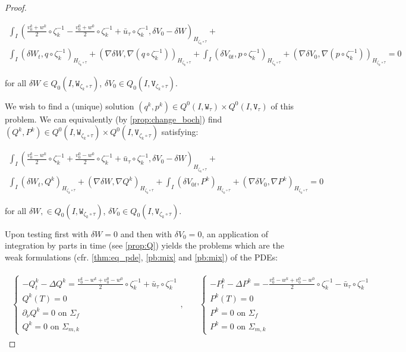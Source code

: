 \documentclass[english,a4paper,9pt,oneside]{scrbook}	%
\theoremstyle{break}
\newenvironment{mproof}[1][\proofname]{%
  \begin{proof}[#1]$ $\par\nobreak\ignorespaces
}{%
  \end{proof}
}
\renewcommand*{\proofname}{Proof}
\theoremstyle{remark}
\newcommand{\tw}[1]{\texttt{#1}}
\begin{document}
\begin{mproof}
\begin{align*}
\int_I \left (\frac{v_0^k+w^k}{2}\circ \zeta_k^{-1}- \frac{v_0^0+w^0}{2}\circ \zeta_k^{-1}+\bar{u}_\tau\circ \zeta_k^{-1} ,\delta V_0-\delta W\right)_{H_{\zeta_k \circ \tau}}+\\
\int_I ( \delta W_t , q\circ \zeta_k^{-1})_{H_{\zeta_k \circ \tau}}+ (\nabla\delta W, \nabla( q\circ \zeta_k^{-1}))_{H_{\zeta_k \circ \tau}}+
\int_I ( \delta V_{0t},p \circ \zeta_k^{-1})_{H_{\zeta_k \circ \tau}} + ( \nabla \delta V_0, \nabla (p\circ \zeta_k^{-1}))_{H_{\zeta_k \circ \tau}} = 0
\end{align*}

for all $\delta W \in Q_0(I, \tw{W}_{\zeta_k \circ \tau})$, $ \delta V_{0} \in Q_0(I,\tw{V}_{\zeta_k \circ \tau})$.

We wish to find a (unique) solution $(q^k, p^k) \in Q^0(I, \tw{W}_\tau)\times Q^0(I, \tw{V}_\tau)$ of this problem. We can equivalently (by \cref{prop:change_boch}) find $(Q^k, P^k) \in Q^0(I, \tw{W}_{\zeta_k \circ \tau})\times Q^0(I, \tw{V}_{\zeta_k \circ \tau})$ satisfying:

\begin{align*}
\int_I \left (\frac{v_0^k-w^k}{2}\circ \zeta_k^{-1}+ \frac{v_0^0-w^0}{2}\circ \zeta_k^{-1}+\bar{u}_\tau\circ \zeta_k^{-1} ,\delta V_0-\delta W\right)_{H_{\zeta_k \circ \tau}}+\\
\int_I (\delta W_t ,Q^k )_{H_{\zeta_k \circ \tau}}+ (\nabla \delta W, \nabla Q^k)_{H_{\zeta_k \circ \tau}}+
\int_I( \delta V_{0t},P^k)_{H_{\zeta_k \circ \tau}} + ( \nabla \delta V_0, \nabla P^k)_{H_{\zeta_k \circ \tau}} = 0
\end{align*}

for all $\delta W, \in Q_0(I, \tw{W}_{\zeta_k \circ \tau})$, $ \delta V_{0} \in Q_0(I,\tw{V}_{\zeta_k \circ \tau})$.

Upon testing first with $\delta W=0$ and then with $\delta V_0=0$, an application of integration by parts in time (see \cref{prop:Q}) yields the problems which are the weak formulations (cfr. \cref{thm:eq_pde}, \cref{pb:mix} and \cref{pb:mix}) of the PDEs:

\begin{align*}
\begin{matrix}
\left\{\begin{matrix}
-Q^k_t-\Delta Q^k =\frac{v_0^k-w^k+v_0^0-w^0}{2}\circ \zeta_k^{-1}+\bar{u}_\tau\circ \zeta_k^{-1} \\
Q^k(T)=0\\
\partial_\nu Q^k = 0 \text{ on } \Sigma_f\\
Q^k = 0 \text{ on } \Sigma_{m,k}
\end{matrix}\right.
, \quad &
\left\{\begin{matrix}
-P^k_t-\Delta P^k =-\frac{v_0^k-w^k+v_0^0-w^0}{2}\circ \zeta_k^{-1}-\bar{u}_\tau\circ \zeta_k^{-1} \\
P^k(T)=0\\
P^k = 0 \text{ on } \Sigma_f\\
P^k = 0 \text{ on } \Sigma_{m,k}
\end{matrix}\right.
\end{matrix}
\end{align*}


\end{mproof}
\end{document}
